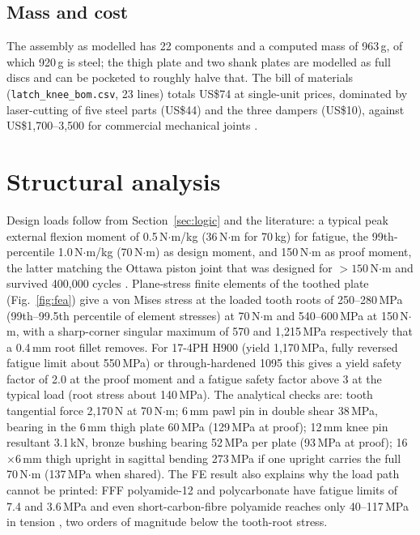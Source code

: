 \documentclass[11pt,a4paper]{article}
\begin{document}
\subsection{Mass and cost}
The assembly as modelled has 22 components and a computed mass of 963\,g, of which 920\,g is steel; the thigh plate and two shank plates are modelled as full discs and can be pocketed to roughly halve that. The bill of materials (\texttt{latch\_knee\_bom.csv}, 23 lines) totals US\$74 at single-unit prices, dominated by laser-cutting of five steel parts (US\$44) and the three dampers (US\$10), against US\$1{,}700--3{,}500 for commercial mechanical joints \cite{price_freewalk_kit,price_spl2_uk}.

\section{Structural analysis}\label{sec:structural}
Design loads follow from Section~\ref{sec:logic} and the literature: a typical peak external flexion moment of 0.5\,N$\cdot$m/kg (36\,N$\cdot$m for 70\,kg) for fatigue, the 99th-percentile 1.0\,N$\cdot$m/kg (70\,N$\cdot$m) as design moment, and 150\,N$\cdot$m as proof moment, the latter matching the Ottawa piston joint that was designed for $>150$\,N$\cdot$m and survived 400{,}000 cycles \cite{lemaire2009}. Plane-stress finite elements of the toothed plate (Fig.~\ref{fig:fea}) give a von Mises stress at the loaded tooth roots of 250--280\,MPa (99th--99.5th percentile of element stresses) at 70\,N$\cdot$m and 540--600\,MPa at 150\,N$\cdot$m, with a sharp-corner singular maximum of 570 and 1{,}215\,MPa respectively that a 0.4\,mm root fillet removes. For 17-4PH H900 (yield 1{,}170\,MPa, fully reversed fatigue limit about 550\,MPa) or through-hardened 1095 this gives a yield safety factor of 2.0 at the proof moment and a fatigue safety factor above 3 at the typical load (root stress about 140\,MPa). The analytical checks are: tooth tangential force 2{,}170\,N at 70\,N$\cdot$m; 6\,mm pawl pin in double shear 38\,MPa, bearing in the 6\,mm thigh plate 60\,MPa (129\,MPa at proof); 12\,mm knee pin resultant 3.1\,kN, bronze bushing bearing 52\,MPa per plate (93\,MPa at proof); 16$\times$6\,mm thigh upright in sagittal bending 273\,MPa if one upright carries the full 70\,N$\cdot$m (137\,MPa when shared). The FE result also explains why the load path cannot be printed: FFF polyamide-12 and polycarbonate have fatigue limits of 7.4 and 3.6\,MPa \cite{nylon12_pc_fatigue2026} and even short-carbon-fibre polyamide reaches only 40--117\,MPa in tension \cite{scf_pa_fff2021}, two orders of magnitude below the tooth-root stress.
\end{document}
